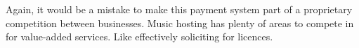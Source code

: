 Again, it would be a mistake to make this payment system part of a proprietary
competition between businesses. Music hosting has plenty of areas to compete in
for value-added services. Like ef\hbox{}fectively soliciting for licences.


























































































